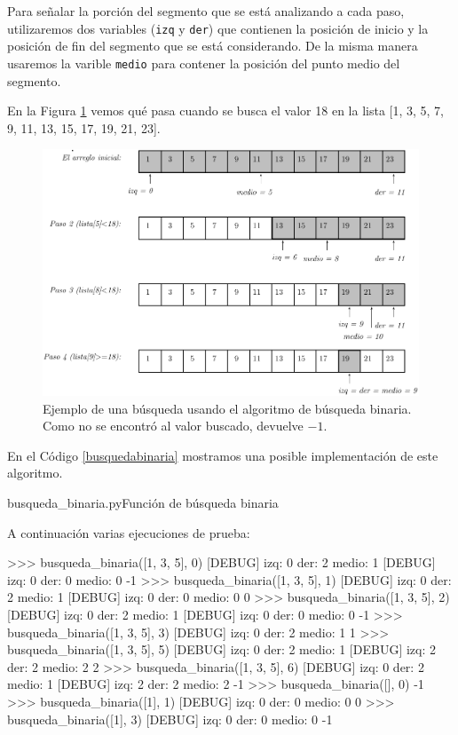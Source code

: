 Para señalar la porción del segmento que se está analizando a cada paso,
utilizaremos dos variables (\lstinline!izq! y \lstinline!der!) que
contienen la posición de inicio y la posición de fin del segmento que se
está considerando. De la misma manera usaremos la varible \lstinline!medio!
para contener la posición del punto medio del segmento.

En la Figura \ref{fig:busqbin} vemos qué pasa cuando se busca
el valor 18 en la lista [1, 3, 5, 7, 9, 11, 13, 15, 17, 19, 21, 23].

\begin{figure}[h!t]
\begin{center}
\includegraphics[width=\linewidth]{graficos/uni8-seguimiento}
\end{center}
\caption{Ejemplo de una búsqueda usando el algoritmo de búsqueda binaria.
Como no se encontró al valor buscado, devuelve $-1$.}
\label{fig:busqbin}
\end{figure}

En el Código \ref{busquedabinaria} mostramos una posible implementación de
este algoritmo.

\begin{codigo}{busqueda\_binaria.py}{Función de búsqueda binaria}
\label{busquedabinaria}

\end{codigo}

A continuación varias ejecuciones de prueba:

\begin{codigo-python-sn}
>>> busqueda_binaria([1, 3, 5], 0)
[DEBUG] izq: 0 der: 2 medio: 1
[DEBUG] izq: 0 der: 0 medio: 0
-1
>>> busqueda_binaria([1, 3, 5], 1)
[DEBUG] izq: 0 der: 2 medio: 1
[DEBUG] izq: 0 der: 0 medio: 0
0
>>> busqueda_binaria([1, 3, 5], 2)
[DEBUG] izq: 0 der: 2 medio: 1
[DEBUG] izq: 0 der: 0 medio: 0
-1
>>> busqueda_binaria([1, 3, 5], 3)
[DEBUG] izq: 0 der: 2 medio: 1
1
>>> busqueda_binaria([1, 3, 5], 5)
[DEBUG] izq: 0 der: 2 medio: 1
[DEBUG] izq: 2 der: 2 medio: 2
2
>>> busqueda_binaria([1, 3, 5], 6)
[DEBUG] izq: 0 der: 2 medio: 1
[DEBUG] izq: 2 der: 2 medio: 2
-1
>>> busqueda_binaria([], 0)
-1
>>> busqueda_binaria([1], 1)
[DEBUG] izq: 0 der: 0 medio: 0
0
>>> busqueda_binaria([1], 3)
[DEBUG] izq: 0 der: 0 medio: 0
-1
\end{codigo-python-sn}

